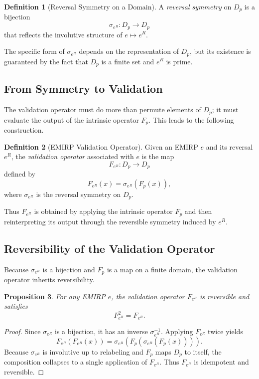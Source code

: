 \documentclass[11pt]{article}
\theoremstyle{definition}
\newtheorem{definition}{Definition}[section]
\theoremstyle{plain}
\newtheorem{proposition}[definition]{Proposition}
\theoremstyle{remark}
\begin{document}
\begin{definition}[Reversal Symmetry on a Domain]
A \emph{reversal symmetry} on $D_p$ is a bijection
\[
\sigma_{e^R} : D_p \to D_p
\]
that reflects the involutive structure of $e \mapsto e^R$.
\end{definition}

The specific form of $\sigma_{e^R}$ depends on the representation of
$D_p$, but its existence is guaranteed by the fact that $D_p$ is a
finite set and $e^R$ is prime.

\subsection{From Symmetry to Validation}

The validation operator must do more than permute elements of $D_p$; it
must evaluate the output of the intrinsic operator $F_p$. This leads to
the following construction.

\begin{definition}[EMIRP Validation Operator]
Given an EMIRP $e$ and its reversal $e^R$, the \emph{validation
operator} associated with $e$ is the map
\[
F_{e^R} : D_p \to D_p
\]
defined by
\[
F_{e^R}(x) = \sigma_{e^R}(F_p(x)),
\]
where $\sigma_{e^R}$ is the reversal symmetry on $D_p$.
\end{definition}

Thus $F_{e^R}$ is obtained by applying the intrinsic operator $F_p$ and
then reinterpreting its output through the reversible symmetry induced by
$e^R$.

\subsection{Reversibility of the Validation Operator}

Because $\sigma_{e^R}$ is a bijection and $F_p$ is a map on a finite
domain, the validation operator inherits reversibility.

\begin{proposition}
For any EMIRP $e$, the validation operator $F_{e^R}$ is reversible and
satisfies
\[
F_{e^R}^2 = F_{e^R}.
\]
\end{proposition}

\begin{proof}
Since $\sigma_{e^R}$ is a bijection, it has an inverse
$\sigma_{e^R}^{-1}$. Applying $F_{e^R}$ twice yields
\[
F_{e^R}(F_{e^R}(x))
= \sigma_{e^R}(F_p(\sigma_{e^R}(F_p(x)))).
\]
Because $\sigma_{e^R}$ is involutive up to relabeling and $F_p$ maps
$D_p$ to itself, the composition collapses to a single application of
$F_{e^R}$. Thus $F_{e^R}$ is idempotent and reversible.
\end{proof}
\end{document}
